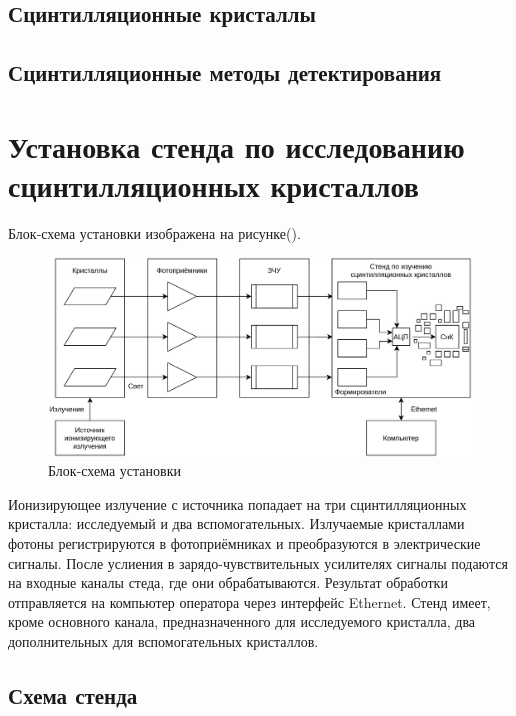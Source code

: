 \documentclass[a4paper, 12pt]{article}
\begin{document}
    \subsection{Сцинтилляционные кристаллы}
    
    \subsection{Сцинтилляционные методы детектирования}
    

\section{Установка стенда по исследованию сцинтилляционных кристаллов}
    Блок-схема установки изображена на рисунке().\par
    \begin{figure}[ht]
        \centering
        \includegraphics[width=1\linewidth]{Experimental_setup.png}
        \caption{Блок-схема установки}
        \label{fig:mpr}
    \end{figure}
    Ионизирующее излучение с источника попадает на три сцинтилляционных кристалла: исследуемый и два вспомогательных. Излучаемые кристаллами фотоны регистрируются в фотоприёмниках и преобразуются в электрические сигналы. После услиения в зарядо-чувствительных усилителях сигналы подаются на входные каналы стеда, где они обрабатываются. Результат обработки отправляется на компьютер оператора через интерфейс Ethernet. Стенд имеет, кроме основного канала, предназначенного для исследуемого кристалла, два дополнительных для вспомогательных кристаллов.
    
    \subsection{Схема стенда}
    
\end{document}
